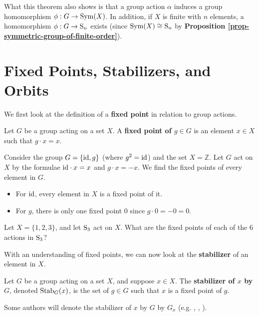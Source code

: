 \begin{remark}
    What this theorem also shows is that a group action $\alpha$ induces a group homomorphism $\phi: G \to \mathrm{Sym}(X)$. In addition, if $X$ is finite with $n$ elements, a homomorphism $\phi: G \to \mathrm{S}_{n}$ exists (since $\mathrm{Sym}(X) \cong \mathrm{S}_{n}$ by \textbf{Proposition \ref{prop-symmetric-group-of-finite-order}}).
\end{remark}

\section{Fixed Points, Stabilizers, and Orbits}
We first look at the definition of a \textbf{fixed point} in relation to group actions.

\begin{definition}
    Let $G$ be a group acting on a set $X$. A \textbf{fixed point of $g \in G$} is an element $x \in X$ such that $g\cdot x = x$.
\end{definition}

\begin{example}
    Consider the group $G = \{\mathrm{id}, g\}$ (where $g^2 = \mathrm{id}$) and the set $X = \mathbb{Z}$. Let $G$ act on $X$ by the formulae $\mathrm{id}\cdot x = x$ and $g\cdot x = -x$. We find the fixed points of every element in $G$.
    \begin{itemize}
        \item For $\mathrm{id}$, every element in $X$ is a fixed point of it.
        \item For $g$, there is only one fixed point 0 since $g\cdot 0 = -0 = 0$.
    \end{itemize}
\end{example}

\begin{exercise}
    Let $X = \{1, 2, 3\}$, and let $\mathrm{S}_{3}$ act on $X$. What are the fixed points of each of the 6 actions in $\mathrm{S}_{3}$?
\end{exercise}

With an understanding of fixed points, we can now look at the \textbf{stabilizer} of an element in $X$.

\begin{definition}
    Let $G$ be a group acting on a set $X$, and suppose $x \in X$. The \textbf{stabilizer of $x$ by $G$}, denoted $\mathrm{Stab}_{G}(x)$, is the set of $g \in G$ such that $x$ is a fixed point of $g$.
\end{definition}
\begin{remark}
    Some authors will denote the stabilizer of $x$ by $G$ by $G_x$ (e.g. \cite{clark_1984}, \cite{humphreys_1996}, \cite{brilliant_groupactions}).
\end{remark}

